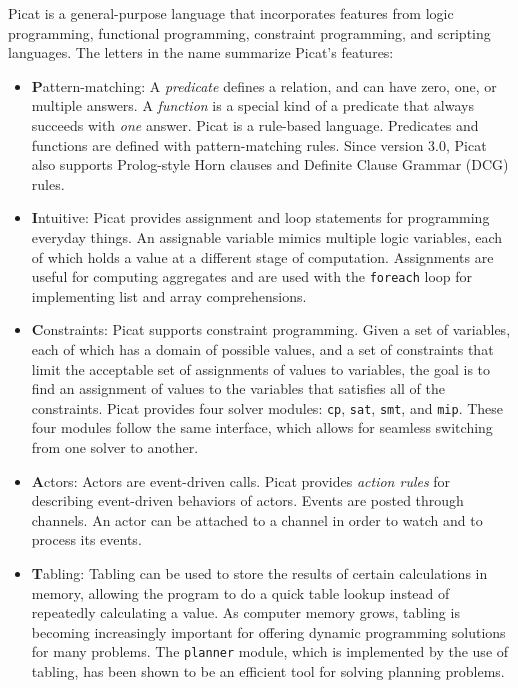 Picat is a general-purpose language that incorporates features from logic programming, functional programming, constraint programming,  and scripting languages. The letters in the name summarize Picat's features:

\begin{itemize}
\item \textbf{P}attern-matching: A \emph{predicate} defines a relation, and can have zero, one, or multiple answers. A \emph{function} is a special kind of a predicate that always succeeds with \emph{one} answer. Picat is a rule-based language. Predicates and functions are defined with pattern-matching rules. Since version 3.0, Picat also supports Prolog-style Horn clauses and Definite Clause Grammar (DCG) rules.

\item \textbf{I}ntuitive: Picat provides assignment and loop statements for programming everyday things. An assignable variable mimics multiple logic variables, each of which holds a value at a different stage of computation. Assignments are useful for computing aggregates and are used with the {\tt foreach} loop for implementing list and array comprehensions.

\item \textbf{C}onstraints: Picat supports constraint programming.  Given a set of variables, each of which has a domain of possible values, and a set of constraints that limit the acceptable set of assignments of values to variables, the goal is to find an assignment of values to the variables that satisfies all of the constraints. Picat provides four solver modules: {\tt cp}, {\tt sat}, {\tt smt}, and {\tt mip}. These four modules follow the same interface, which allows for seamless switching from one solver to another.

\item \textbf{A}ctors: Actors are event-driven calls.  Picat provides \emph{action rules} for describing event-driven behaviors of actors. Events are posted through channels. An actor can be attached to a channel in order to watch and to process its events.

\item \textbf{T}abling: Tabling can be used to store the results of certain calculations in memory, allowing the program to do a quick table lookup instead of repeatedly calculating a value. As computer memory grows, tabling is becoming increasingly important for offering dynamic programming solutions for many problems. The \texttt{planner} module, which is implemented by the use of tabling, has been shown to be an efficient tool for solving planning problems.

\end{itemize}


